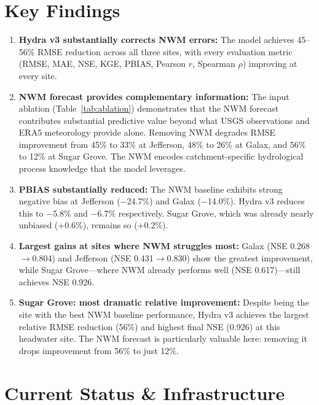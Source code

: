 \documentclass[11pt]{article}
\begin{document}
\section{Key Findings}

\begin{enumerate}
    \item \textbf{Hydra v3 substantially corrects NWM errors:} The model achieves 45--56\% RMSE reduction across all three sites, with every evaluation metric (RMSE, MAE, NSE, KGE, PBIAS, Pearson $r$, Spearman $\rho$) improving at every site.

    \item \textbf{NWM forecast provides complementary information:} The input ablation (Table~\ref{tab:ablation}) demonstrates that the NWM forecast contributes substantial predictive value beyond what USGS observations and ERA5 meteorology provide alone. Removing NWM degrades RMSE improvement from 45\% to 33\% at Jefferson, 48\% to 26\% at Galax, and 56\% to 12\% at Sugar Grove. The NWM encodes catchment-specific hydrological process knowledge that the model leverages.

    \item \textbf{PBIAS substantially reduced:} The NWM baseline exhibits strong negative bias at Jefferson ($-$24.7\%) and Galax ($-$14.0\%). Hydra v3 reduces this to $-$5.8\% and $-$6.7\% respectively. Sugar Grove, which was already nearly unbiased ($+$0.6\%), remains so ($+$0.2\%).

    \item \textbf{Largest gains at sites where NWM struggles most:} Galax (NSE 0.268$\rightarrow$0.804) and Jefferson (NSE 0.431$\rightarrow$0.830) show the greatest improvement, while Sugar Grove---where NWM already performs well (NSE 0.617)---still achieves NSE 0.926.

    \item \textbf{Sugar Grove: most dramatic relative improvement:} Despite being the site with the best NWM baseline performance, Hydra v3 achieves the largest relative RMSE reduction (56\%) and highest final NSE (0.926) at this headwater site. The NWM forecast is particularly valuable here: removing it drops improvement from 56\% to just 12\%.
\end{enumerate}

\section{Current Status \& Infrastructure}
\end{document}
